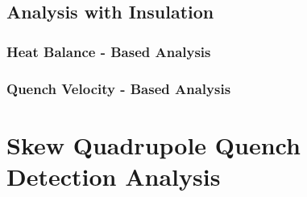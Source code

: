 \documentclass{article}
\begin{document}
\subsection{Analysis with Insulation}
\label{subsection:quench_velocity_benchmarking_with_insulation}


\subsubsection{Heat Balance - Based Analysis}
\label{subsection:quench_velocity_benchmarking_with_insulation_heat_balance}


\subsubsection{Quench Velocity - Based Analysis}
\label{subsection:quench_velocity_benchmarking_with_insulation_quench_velocity}


\clearpage
\section{Skew Quadrupole Quench Detection Analysis}
\label{section:skew_quadrupole_quench_detection_analysis}
% 

% 

% 

% 

% 
\end{document}
